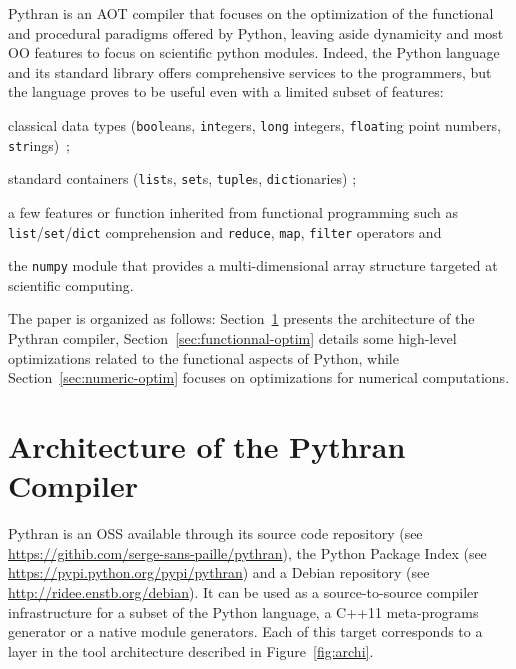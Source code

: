 \documentclass{llncs}
\begin{document}
Pythran\cite{pythran2013} is an \ac{AOT} compiler that focuses on the
optimization of the functional and procedural paradigms offered by Python,
leaving aside dynamicity and most \ac{OO} features to focus on scientific python modules.  Indeed, the Python
language and its standard library offers comprehensive services to the
programmers, but the language proves to be useful even with a limited subset of
features:
\begin{inparaenum}[1)]
\item classical data types (\texttt{bool}eans, \texttt{int}egers,
\texttt{long} integers, \texttt{float}ing point numbers, \texttt{str}ings)~;
\item standard containers (\texttt{list}s, \texttt{set}s, \texttt{tuple}s,
\texttt{dict}ionaries) ;
\item a few features or function inherited from
functional programming such as \texttt{list}/\texttt{set}/\texttt{dict}
comprehension and \texttt{reduce}, \texttt{map}, \texttt{filter} operators and
\item the \texttt{numpy} module that
provides a multi-dimensional array structure targeted at scientific computing. 
\end{inparaenum}

The paper is organized as follows: Section~\ref{sec:architecture} presents the
architecture of the Pythran compiler, Section~\ref{sec:functionnal-optim}
details some high-level optimizations related to the functional aspects of
Python, while Section~\ref{sec:numeric-optim} focuses on optimizations for
numerical computations.

\section{Architecture of the Pythran Compiler}
\label{sec:architecture}

Pythran is an \ac{OSS} available through its source code
repository (see \url{https://githib.com/serge-sans-paille/pythran}), the
Python Package Index (see \url{https://pypi.python.org/pypi/pythran}) and
a Debian repository (see \url{http://ridee.enstb.org/debian}). It can be
used as a source-to-source compiler infrastructure for a subset of the Python
language, a C++11 meta-programs generator or a native module generators. Each
of this target corresponds to a layer in the tool architecture described in
Figure~\ref{fig:archi}.
\end{document}
